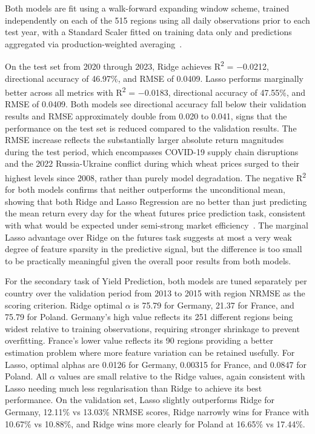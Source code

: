 \documentclass[pdflatex,sn-mathphys-num, oneside]{sn-jnl}%
\theoremstyle{thmstyleone}%
\theoremstyle{thmstyletwo}%
\theoremstyle{thmstylethree}%
\begin{document}
Both models are fit using a walk-forward expanding window scheme, trained independently on each of the 515 regions using all daily observations prior to each test year, with a Standard Scaler fitted on training data only and predictions aggregated via production-weighted averaging~\cite{bib16}.

On the test set from 2020 through 2023, Ridge achieves R\textsuperscript{2} = −0.0212, directional accuracy of 46.97\%, and RMSE of 0.0409. Lasso performs marginally better across all metrics with R\textsuperscript{2} = −0.0183, directional accuracy of 47.55\%, and RMSE of 0.0409. Both models see directional accuracy fall below their validation results and RMSE approximately double from 0.020 to 0.041, signs that the performance on the test set is reduced compared to the validation results. The RMSE increase reflects the substantially larger absolute return magnitudes during the test period, which encompasses COVID-19 supply chain disruptions and the 2022 Russia-Ukraine conflict during which wheat prices surged to their highest levels since 2008, rather than purely model degradation. The negative R\textsuperscript{2} for both models confirms that neither outperforms the unconditional mean, showing that both Ridge and Lasso Regression are no better than just predicting the mean return every day for the wheat futures price prediction task, consistent with what would be expected under semi-strong market efficiency~\cite{bib30}. The marginal Lasso advantage over Ridge on the futures task suggests at most a very weak degree of feature sparsity in the predictive signal, but the difference is too small to be practically meaningful given the overall poor results from both models. 

For the secondary task of Yield Prediction, both models are tuned separately per country over the validation period from 2013 to 2015 with region NRMSE as the scoring criterion. Ridge optimal $\alpha$ is 75.79 for Germany, 21.37 for France, and 75.79 for Poland. Germany's high value reflects its 251 different regions being widest relative to training observations, requiring stronger shrinkage to prevent overfitting. France's lower value reflects its 90 regions providing a better estimation problem where more feature variation can be retained usefully. For Lasso, optimal alphas are 0.0126 for Germany, 0.00315 for France, and 0.0847 for Poland. All $\alpha$ values are small relative to the Ridge values, again consistent with Lasso needing much less regularisation than Ridge to achieve its best performance. On the validation set, Lasso slightly outperforms Ridge for Germany, 12.11\% vs 13.03\% NRMSE scores, Ridge narrowly wins for France with 10.67\% vs 10.88\%, and Ridge wins more clearly for Poland at 16.65\% vs 17.44\%.
\end{document}
